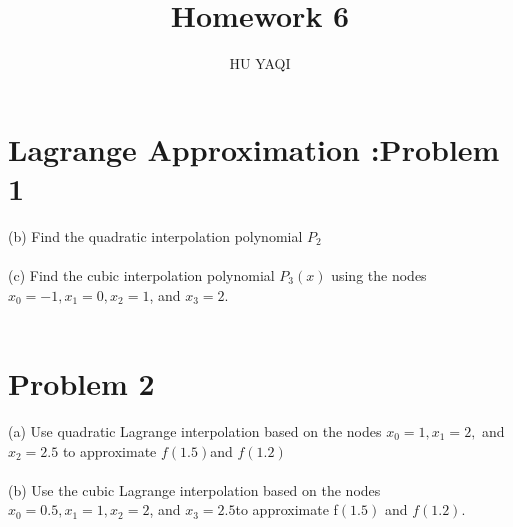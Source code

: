 \documentclass{article}
\title{ Homework 6 }
\author{HU YAQI}
\begin{document}
\maketitle
\setlength{\parindent}{0pt}

\section{ Lagrange Approximation :Problem 1 }
(b) \; Find the quadratic interpolation polynomial $P_2$\\
\\
(c) \; Find the cubic interpolation polynomial $P_3(x)$ using the nodes $x_0=-1, x_1=0,x_2=1$, and $x_3=2.$\\
\\

\section{ Problem 2 }
(a) Use quadratic Lagrange interpolation based on the nodes $x_0=1, x_1=2,$ and $x_2=2.5$ to approximate $f(1.5)$and $f(1.2)$\\
\\
(b) Use the cubic Lagrange interpolation based on the nodes $x_0=0.5, x_1=1, x_2=2$, and $x_3=2.5 $to approximate f$(1.5)$ and $f(1.2).$
\end{document}
